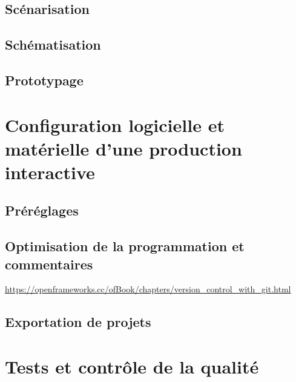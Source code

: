 \documentclass[
  french,
]{book}
\begin{document}
\hypertarget{scuxe9narisation}{%
\subsection{Scénarisation}\label{scuxe9narisation}}

\hypertarget{schuxe9matisation}{%
\subsection{Schématisation}\label{schuxe9matisation}}

\hypertarget{prototypage}{%
\subsection{Prototypage}\label{prototypage}}

\hypertarget{configuration-logicielle-et-matuxe9rielle-dune-production-interactive}{%
\section{Configuration logicielle et matérielle d'une production interactive}\label{configuration-logicielle-et-matuxe9rielle-dune-production-interactive}}

\hypertarget{pruxe9ruxe9glages}{%
\subsection{Préréglages}\label{pruxe9ruxe9glages}}

\hypertarget{optimisation-de-la-programmation-et-commentaires}{%
\subsection{Optimisation de la programmation et commentaires}\label{optimisation-de-la-programmation-et-commentaires}}

\url{https://openframeworks.cc/ofBook/chapters/version_control_with_git.html}

\hypertarget{exportation-de-projets}{%
\subsection{Exportation de projets}\label{exportation-de-projets}}

\hypertarget{tests-et-contruxf4le-de-la-qualituxe9}{%
\section{Tests et contrôle de la qualité}\label{tests-et-contruxf4le-de-la-qualituxe9}}
\end{document}
